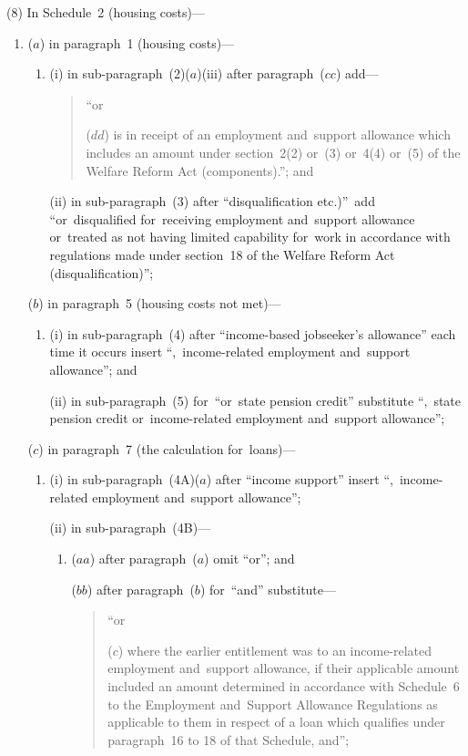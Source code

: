 \documentclass[12pt,a4paper]{article}
\begin{document}
(8) In Schedule~2 (housing costs)—
\begin{enumerate}\item[]
($a$) in paragraph~1 (housing costs)—
\begin{enumerate}\item[]
(i) in sub-paragraph~(2)($a$)(iii)  after paragraph~($cc$)  add—
\begin{quotation}
“or

($dd$) is in receipt of an employment and~support allowance which includes an amount under section~2(2) or~(3) or~4(4) or~(5) of the Welfare Reform Act (components).”; and
\end{quotation}

(ii) in sub-paragraph~(3) after “disqualification etc.)”\ add “or~disqualified for~receiving employment and~support allowance or~treated as not having limited capability for~work in accordance with regulations made under section~18 of the Welfare Reform Act (disqualification)”;
\end{enumerate}

($b$) in paragraph~5 (housing costs not met)—
\begin{enumerate}\item[]
(i) in sub-paragraph~(4) after “income-based jobseeker’s allowance” each time it occurs insert “,~income-related employment and~support allowance”; and

(ii) in sub-paragraph~(5) for~“or~state pension credit” substitute “,~state pension credit or~income-related employment and~support allowance”;
\end{enumerate}

($c$) in paragraph~7 (the calculation for~loans)—
\begin{enumerate}\item[]
(i) in sub-paragraph~(4A)($a$)  after “income support” insert “,~income\hspace{0pt}-related employment and~support allowance”;

(ii) in sub-paragraph~(4B)—
\begin{enumerate}\item[]
($aa$) after paragraph~($a$)  omit “or”; and

($bb$) after paragraph~($b$)  for~“and” substitute—
\begin{quotation}
“or

($c$) where the earlier entitlement was to an income-related employment and~support allowance, if their applicable amount included an amount determined in accordance with Schedule~6 to the Employment and~Support Allowance Regulations as applicable to them in respect of a loan which qualifies under paragraph~16 to 18 of that Schedule, and”;
\end{quotation}
\end{enumerate}
\end{enumerate}


\end{enumerate}
\end{document}
